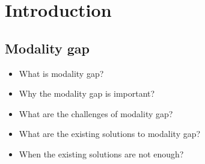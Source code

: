 \section{Introduction}
\label{sec:intro}

\subsection{Modality gap}
\label{subsec:modality_gap}
\begin{itemize}
  \item What is modality gap?
  \item Why the modality gap is important?
  \item What are the challenges of modality gap?
  \item What are the existing solutions to modality gap?
  \item When the existing solutions are not enough?
\end{itemize}
